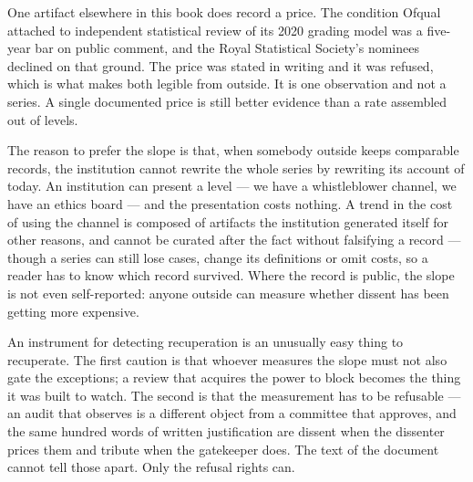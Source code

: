 One artifact elsewhere in this book does record a price. The condition Ofqual attached to independent statistical review of its 2020 grading model was a five-year bar on public comment, and the Royal Statistical Society's nominees declined on that ground. The price was stated in writing and it was refused, which is what makes both legible from outside. It is one observation and not a series. A single documented price is still better evidence than a rate assembled out of levels.

The reason to prefer the slope is that, when somebody outside keeps comparable records, the institution cannot rewrite the whole series by rewriting its account of today. An institution can present a level — we have a whistleblower channel, we have an ethics board — and the presentation costs nothing. A trend in the cost of using the channel is composed of artifacts the institution generated itself for other reasons, and cannot be curated after the fact without falsifying a record — though a series can still lose cases, change its definitions or omit costs, so a reader has to know which record survived. Where the record is public, the slope is not even self-reported: anyone outside can measure whether dissent has been getting more expensive.

An instrument for detecting recuperation is an unusually easy thing to recuperate. The first caution is that whoever measures the slope must not also gate the exceptions; a review that acquires the power to block becomes the thing it was built to watch. The second is that the measurement has to be refusable — an audit that observes is a different object from a committee that approves, and the same hundred words of written justification are dissent when the dissenter prices them and tribute when the gatekeeper does. The text of the document cannot tell those apart. Only the refusal rights can.
